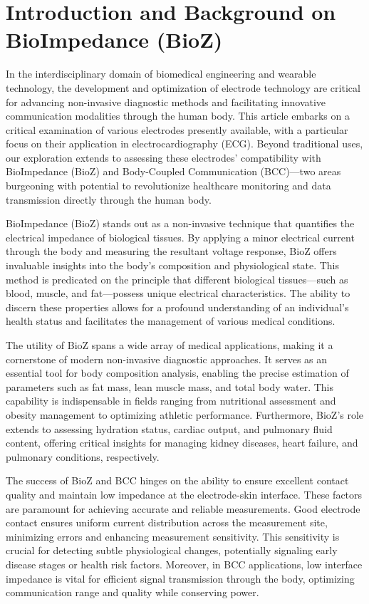 \section{Introduction and Background on BioImpedance (BioZ)}

In the interdisciplinary domain of biomedical engineering and wearable technology, the development and optimization of electrode technology are critical for advancing non-invasive diagnostic methods and facilitating innovative communication modalities through the human body. This article embarks on a critical examination of various electrodes presently available, with a particular focus on their application in electrocardiography (ECG). Beyond traditional uses, our exploration extends to assessing these electrodes' compatibility with BioImpedance (BioZ) and Body-Coupled Communication (BCC)—two areas burgeoning with potential to revolutionize healthcare monitoring and data transmission directly through the human body.

BioImpedance (BioZ) stands out as a non-invasive technique that quantifies the electrical impedance of biological tissues. By applying a minor electrical current through the body and measuring the resultant voltage response, BioZ offers invaluable insights into the body's composition and physiological state. This method is predicated on the principle that different biological tissues—such as blood, muscle, and fat—possess unique electrical characteristics. The ability to discern these properties allows for a profound understanding of an individual's health status and facilitates the management of various medical conditions.

The utility of BioZ spans a wide array of medical applications, making it a cornerstone of modern non-invasive diagnostic approaches. It serves as an essential tool for body composition analysis, enabling the precise estimation of parameters such as fat mass, lean muscle mass, and total body water. This capability is indispensable in fields ranging from nutritional assessment and obesity management to optimizing athletic performance. Furthermore, BioZ's role extends to assessing hydration status, cardiac output, and pulmonary fluid content, offering critical insights for managing kidney diseases, heart failure, and pulmonary conditions, respectively.

The success of BioZ and BCC hinges on the ability to ensure excellent contact quality and maintain low impedance at the electrode-skin interface. These factors are paramount for achieving accurate and reliable measurements. Good electrode contact ensures uniform current distribution across the measurement site, minimizing errors and enhancing measurement sensitivity. This sensitivity is crucial for detecting subtle physiological changes, potentially signaling early disease stages or health risk factors. Moreover, in BCC applications, low interface impedance is vital for efficient signal transmission through the body, optimizing communication range and quality while conserving power.

